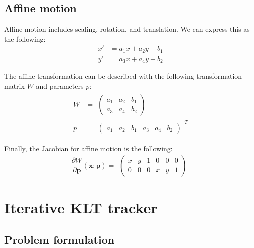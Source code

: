 \documentclass{article}
\begin{document}
\subsection{Affine motion}
Affine motion includes scaling, rotation, and translation.
We can express this as the following:
\begin{equation}
	\begin{aligned}
		x' &= a_1 x + a_2 y + b_1 \\
        y' &= a_3 x + a_4 y + b_2
	\end{aligned}
\end{equation}

The affine transformation can be described with the following transformation matrix $W$ and parameters $p$:
\begin{equation}
	\begin{aligned}
		W &= \begin{matrix}
			\begin{pmatrix}
				a_1 & a_2 & b_1 \\
                a_3 & a_4 & b_2
			\end{pmatrix}
		\end{matrix}\\
        p &= \begin{matrix}
        	\begin{pmatrix}
        		a_1 & a_2 & b_1 & a_3 & a_4 & b_2
        	\end{pmatrix}
        \end{matrix} ^ T
	\end{aligned}
\end{equation}

Finally, the Jacobian for affine motion is the following:
\begin{equation}
	\frac{\partial W}{\partial \bm{p}} (\bm{x} ; \bm{p}) = \begin{matrix}
		\begin{pmatrix}
			x & y & 1 & 0 & 0 & 0 \\
            0 & 0 & 0 & x & y & 1
		\end{pmatrix}
	\end{matrix}
\end{equation}

\section{Iterative KLT tracker}
\subsection{Problem formulation}
\end{document}
